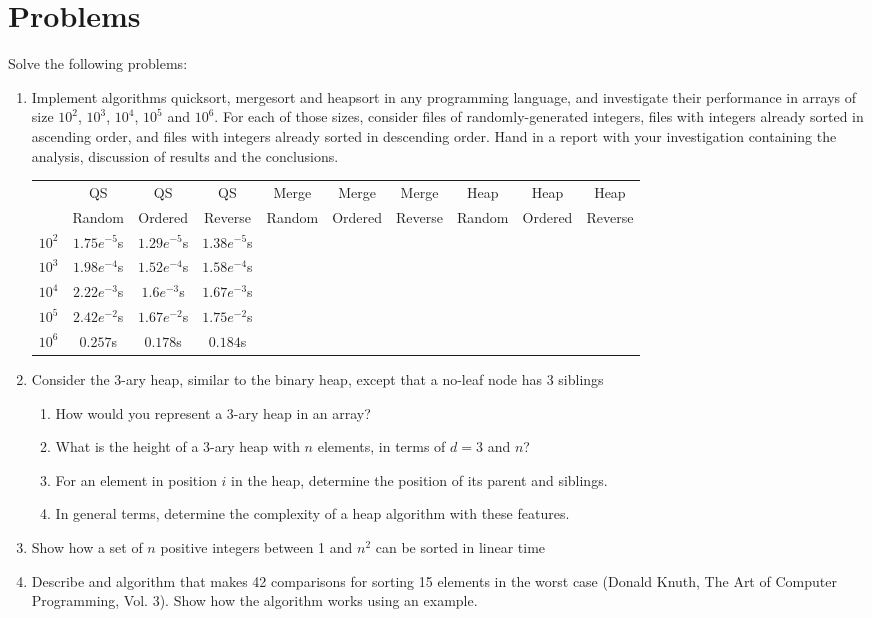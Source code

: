 \documentclass{article}
\begin{document}
\section{Problems}
Solve the following problems:
\begin{enumerate}
    \item Implement algorithms quicksort, mergesort and heapsort in any programming language, and investigate their performance in arrays of size $10^2$, $10^3$, $10^4$, $10^5$ and $10^6$. For each of those sizes, consider files of  randomly-generated  integers,  files  with  integers  already  sorted  in  ascending  order,  and  files  with integers already sorted in descending order. Hand in a report with your investigation containing the analysis, discussion of results and the conclusions.

    \begin{center}
        \begin{tabular}{|c|c|c|c|c|c|c|c|c|c|}
            \hline
            &QS &QS &QS &Merge  &Merge &Merge &Heap &Heap &Heap\\
            &Random &Ordered &Reverse &Random &Ordered &Reverse &Random &Ordered &Reverse\\
            \hline
            $10^2$& $1.75e^{-5}$s & $1.29e^{-5}$s & $1.38e^{-5}$s & & & & & & \\
            $10^3$& $1.98e^{-4}$s & $1.52e^{-4}$s & $1.58e^{-4}$s & & & & & & \\
            $10^4$& $2.22e^{-3}$s & $1.6e^{-3}$s & $1.67e^{-3}$s & & & & & & \\
            $10^5$& $2.42e^{-2}$s & $1.67e^{-2}$s & $1.75e^{-2}$s & & & & & & \\
            $10^6$& $0.257$s& $0.178$s & $0.184$s & & & & & & \\
            \hline
        \end{tabular}
    \end{center}

    \item Consider the 3-ary heap, similar to the binary heap, except that a no-leaf node has 3 siblings
    \begin{enumerate}
        \item How would you represent a 3-ary heap in an array?
        \item What is the height of a 3-ary heap with $n$ elements, in terms of $d = 3$ and $n$?
        \item For an element in position $i$ in the heap, determine the position of its parent and siblings.
        \item In general terms, determine the complexity of a heap algorithm with these features.
    \end{enumerate}

    \item Show how a set of $n$ positive integers between 1 and $n^2$ can be sorted in linear time
    \item Describe and algorithm that makes 42 comparisons for sorting 15 elements in the worst case (Donald Knuth, The Art of Computer Programming, Vol. 3). Show how the algorithm works using an example.
\end{enumerate}
\end{document}
